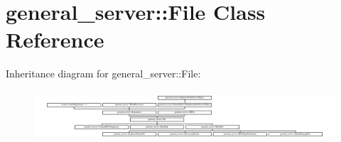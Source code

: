 \hypertarget{classgeneral__server_1_1File}{\section{general\-\_\-server\-:\-:\-File \-Class \-Reference}
\label{classgeneral__server_1_1File}
}
\-Inheritance diagram for general\-\_\-server\-:\-:\-File\-:\begin{figure}[H]
\begin{center}
\leavevmode
\includegraphics[height=1.887640cm]{classgeneral__server_1_1File}
\end{center}
\end{figure}
